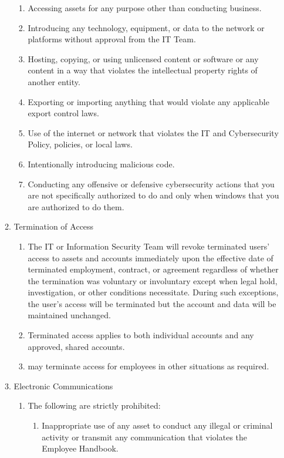 \documentclass[../main.tex]{subfiles}
\begin{document}
\begin{enumerate}
\begin{enumerate}
\begin{enumerate}
            \item Accessing \CompanyName{} assets for any purpose other than conducting \CompanyName{} business.
            \item Introducing any technology, equipment, or data to the \CompanyName{} network or platforms without approval from the IT Team.
            \item Hosting, copying, or using unlicensed content or software or any content in a way that violates the intellectual property rights of another entity.
            \item Exporting or importing anything that would violate any applicable export control laws.
            \item Use of the internet or \CompanyName{} network that violates the IT and Cybersecurity Policy, \CompanyName{} policies, or local laws.
            \item Intentionally introducing malicious code.
            \item Conducting any offensive or defensive cybersecurity actions that you are not specifically authorized to do and only when windows that you are authorized to do them.
        \end{enumerate}
        \item Termination of Access
        \begin{enumerate}
            \item The IT or Information Security Team will revoke terminated users' access to \CompanyName{} assets and accounts immediately upon the effective date of terminated employment, contract, or agreement regardless of whether the termination was voluntary or involuntary except when legal hold, investigation, or other conditions necessitate. During such exceptions, the user’s access will be terminated but the account and data will be maintained unchanged.
            \item Terminated access applies to both individual accounts and any approved, shared accounts.
            \item \CompanyName{} may terminate access for employees in other situations as required.
        \end{enumerate}
        \item Electronic Communications
        \begin{enumerate}
            \item The following are strictly prohibited:
            \begin{enumerate}
                \item Inappropriate use of any \CompanyName{} asset to conduct any illegal or criminal activity or transmit any communication that violates the Employee Handbook.

\end{enumerate}
\end{enumerate}
\end{enumerate}
\end{enumerate}
\end{document}

